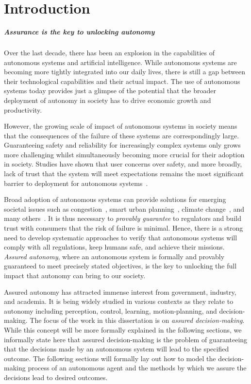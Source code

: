 \chapter{Introduction}

\paragraph{Assurance is the key to unlocking autonomy} Over the last decade, there has been an explosion in the capabilities of autonomous systems and artificial intelligence. While autonomous systems are becoming more tightly integrated into our daily lives, there is still a gap between their technological capabilities and their actual impact. The use of autonomous systems today provides just a glimpse of the potential that the broader deployment of autonomy in society has to drive economic growth and productivity. 

However, the growing scale of impact of autonomous systems in society means that the consequences of the failure of these systems are correspondingly large. Guaranteeing safety and reliability for increasingly complex systems only grows more challenging whilst simultaneously becoming more crucial for their adoption in society. Studies have shown that user concerns over safety, and more broadly, lack of trust that the system will meet expectations remains the most significant barrier to deployment for autonomous systems~\cite{KAUR201887,BEZAI202165,MOLNAR2018319}.  

Broad adoption of autonomous systems can provide solutions for emerging societal issues such as congestion~\cite{LIORIS2017292,8734238}, smart urban planning~\cite{GULSRUD201885,NITOSLAWSKI2019101770}, climate change~\cite{KOLOKOTSA2017101,goddard2021global}, and many others~\cite{DUONG2020355}. It is thus necessary to \emph{provably guarantee} to regulators and build trust with consumers that the risk of failure is minimal. Hence, there is a strong need to develop systematic approaches to verify that autonomous systems will comply with all regulations, keep humans safe, and achieve their missions. \emph{Assured autonomy}, where an autonomous system is formally and provably guaranteed to meet precisely stated objectives, is the key to unlocking the full impact that autonomy can bring to our society. 

Assured autonomy has attracted immense interest from government, industry, and academia. It is being widely studied in various contexts as they relate to autonomy including perception, control, learning, motion-planning, and decision-making. The focus of the work in this dissertation is on \emph{assured decision-making}. While this concept will be more formally explained in the following sections, we informally state here that assured decision-making is the problem of guaranteeing that the decisions made by an autonomous system will lead to the specified outcome. The following sections will formally lay out how to model the decision-making process of an autonomous agent and the methods by which we assure the decisions lead to desired outcomes. 


